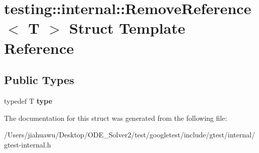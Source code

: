 \hypertarget{structtesting_1_1internal_1_1_remove_reference}{}\section{testing\+:\+:internal\+:\+:Remove\+Reference$<$ T $>$ Struct Template Reference}
\label{structtesting_1_1internal_1_1_remove_reference}
\subsection*{Public Types}
\begin{DoxyCompactItemize}
\item 
\mbox{\label{structtesting_1_1internal_1_1_remove_reference_a9ca4f6499579225f7986b789ee4b2895}} 
typedef T {\bfseries type}
\end{DoxyCompactItemize}


The documentation for this struct was generated from the following file\+:\begin{DoxyCompactItemize}
\item 
/\+Users/jiahuawu/\+Desktop/\+O\+D\+E\+\_\+\+Solver2/test/googletest/include/gtest/internal/gtest-\/internal.\+h\end{DoxyCompactItemize}
